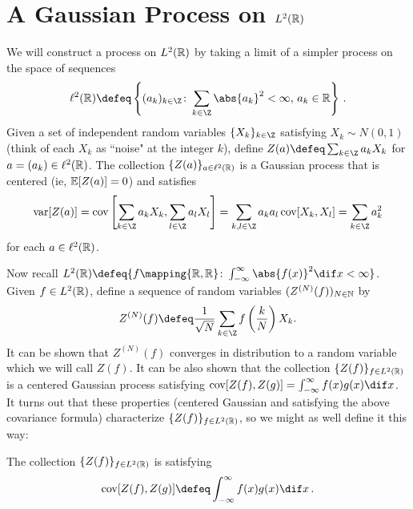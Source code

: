 \documentclass[../../../Master/AppliedStochastics.tex]{subfiles}
\author{Joe}
\date{28 September 2018}
\begin{document}
%


\makelecture


\section{A Gaussian Process on \texorpdfstring{$L^2(\mathbb{R})$}{L2(R)}}


We will construct a process on $L^2(\mathbb{R})$
    by taking a limit of a simpler process on the space of sequences
\begin{equation*}
    \ell^2(\R)\defeq \left\{    (a_k)_{k \in\Z} \colon
        \sum_{k \in \Z} \abs{a_k}^2 < \infty,\, a_k \in \R\right\}\,.
\end{equation*}
Given a set of independent random variables $\{X_k\}_{k \in \Z}$
    satisfying $X_k \sim N(0,1)$
        (think of each $X_k$ as ``noise" at the integer $k$),
    define $Z(a)\defeq \sum_{k \in \Z} a_k X_k$ for $a = (a_k) \in \ell^2(\mathbb{R})$.
The collection $\{Z(a)\}_{a\in\ell^2(\mathbb{R})}$ is a Gaussian process
    that is centered (ie, $\mathbb{E}[Z(a)] = 0$) and satisfies
\begin{equation*}
    \var[Z(a)] = \cov\left[
                    \sum_{k \in \Z} a_k X_k, \sum_{l \in \Z} a_l X_l\right]
               = \sum_{k, l \in \Z} a_k a_l \cov[X_k, X_l]
               = \sum_{k \in \Z} a_k^2
\end{equation*}
    for each $a\in\ell^2(\mathbb{R})$.


Now recall $L^2(\R) \defeq \{f \mapping{\R, \R} \colon
    \int_{-\infty}^\infty \abs{f(x)}^2 \dif x <\infty\}$.
Given $f \in L^2(\mathbb{R})$,
    define a sequence of random variables $(Z^{(N)}(f))_{N \in \mathbb{N}}$ by
\begin{equation*}
    Z^{(N)}(f) \defeq \frac{1}{\sqrt{N}} \sum_{k \in \Z}
                        f\left(\frac{k}{N}\right) X_k.
\end{equation*}
It can be shown that $Z^{(N)}(f)$ converges in distribution
    to a random variable which we will call $Z(f)$.
It can be also shown that the collection $\{Z(f)\}_{f \in L^2(\mathbb{R})}$
    is a centered Gaussian process satisfying
        $\cov[Z(f),Z(g)] = \int_{-\infty}^\infty f(x)g(x) \dif x$.
It turns out that these properties
    (centered Gaussian and satisfying the above covariance formula)
    characterize $\{Z(f)\}_{f\in L^2(\mathbb{R})}$,
    so we might as well define it this way:

\begin{definition}
The collection $\{Z(f)\}_{f \in L^2(\mathbb{R})}$
    is  satisfying
\begin{equation*}
    \cov[Z(f),Z(g)] \defeq \int_{-\infty}^\infty f(x)g(x) \dif x\,.
\end{equation*}
\end{definition} 
\end{document}
